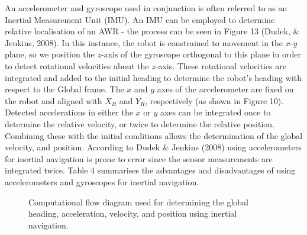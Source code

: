 \documentclass[a4paper]{article}
\begin{document}
An accelerometer and gyroscope used in conjunction is often referred to as an Inertial Measurement Unit (IMU). An IMU can be employed to determine relative localisation of an AWR - the process can be seen in Figure 13 (Dudek, \& Jenkins, 2008). In this instance, the robot is constrained to movement in the $x$-$y$ plane, so we position the $z$-axis of the gyroscope orthogonal to this plane in order to detect rotational velocities about the $z$-axis. These rotational velocities are integrated and added to the initial heading to determine the robot's heading with respect to the Global frame. The $x$ and $y$ axes of the accelerometer are fixed on the robot and aligned with $X_R$ and $Y_R$, respectively (as shown in Figure 10). Detected accelerations in either the $x$ or $y$ axes can be integrated once to determine the relative velocity, or twice to determine the relative position. Combining these with the initial conditions allows the determination of the global velocity, and position. According to Dudek \& Jenkins (2008) using accelerometers for inertial navigation is prone to error since the sensor measurements are integrated twice. Table 4 summarises the advantages and disadvantages of using accelerometers and gyroscopes for inertial navigation.

\begin{figure}[h]
\centering
{}
\caption{Computational flow diagram used for determining the global heading, acceleration, velocity, and position using inertial navigation.}
\end{figure}
\end{document}
